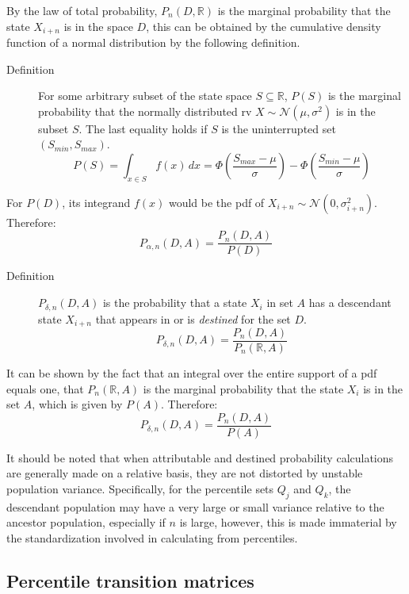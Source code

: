 \documentclass[a4paper,11pt]{article} %
\begin{document}
By the law of total probability, $P_n(D, \mathbb{R})$ is the marginal probability that the state $X_{i+n}$ is in the space $D$, this can be obtained by the cumulative density function of a normal distribution by the following definition.

\begin{description}
\item [Definition] For some arbitrary subset of the state space $S \subseteq \mathbb{R}$, $P(S)$ is the marginal probability that the normally distributed rv $X \sim \mathcal{N}(\mu, \sigma^2)$ is in the subset $S$. The last equality holds if $S$ is the uninterrupted set $(S_{min}, S_{max})$.
$$P(S) = \int_{x\in S} f(x) \, dx = \Phi(\frac{S_{max} - \mu}{\sigma}) - \Phi(\frac{S_{min} - \mu}{\sigma})$$
\end{description}

For $P(D)$, its integrand $f(x)$ would be the pdf of $X_{i+n} \sim \mathcal{N}(0, \sigma_{i+n}^2)$. Therefore:
$$P_{\alpha , n}(D, A) = \frac{P_n(D, A)}{P(D)}$$



\begin{description}
\item [Definition] $P_{\delta , n}(D, A)$ is the probability that a state $X_i$ in set $A$ has a descendant state $X_{i+n}$ that appears in or is \emph{destined} for the set $D$. 
$$P_{\delta , n}(D, A) = \frac{P_n(D, A)}{P_n(\mathbb{R}, A)}$$
\end{description}

It can be shown by the fact that an integral over the entire support of a pdf equals one, that $P_n(\mathbb{R}, A)$ is the marginal probability that the state $X_i$ is in the set $A$, which is given by $P(A)$. Therefore:
%
$$P_{\delta , n}(D, A) = \frac{P_n(D, A)}{P(A)}$$


It should be noted that when attributable and destined probability calculations are generally made on a relative basis, they are not distorted by unstable population variance. Specifically, for the percentile sets $Q_j$ and $Q_k$, the descendant population may have a very large or small variance relative to the ancestor population, especially if $n$ is large, however, this is made immaterial by the standardization involved in calculating from percentiles.

\subsection{Percentile transition matrices}
\end{document}
